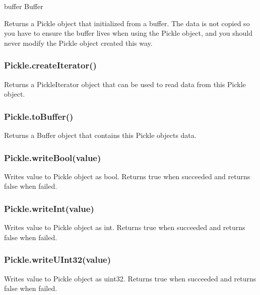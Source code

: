 \begin{DoxyItemize}
\item {\ttfamily buffer} Buffer
\end{DoxyItemize}

Returns a {\ttfamily Pickle} object that initialized from a {\ttfamily buffer}. The data is not copied so you have to ensure the {\ttfamily buffer} lives when using the Pickle object, and you should never modify the Pickle object created this way.

\subsubsection*{Pickle.\+create\+Iterator()}

Returns a {\ttfamily Pickle\+Iterator} object that can be used to read data from this {\ttfamily Pickle} object.

\subsubsection*{Pickle.\+to\+Buffer()}

Returns a {\ttfamily Buffer} object that contains this {\ttfamily Pickle} object\textquotesingle{}s data.

\subsubsection*{Pickle.\+write\+Bool(value)}

Writes {\ttfamily value} to {\ttfamily Pickle} object as {\ttfamily bool}. Returns {\ttfamily true} when succeeded and returns {\ttfamily false} when failed.

\subsubsection*{Pickle.\+write\+Int(value)}

Writes {\ttfamily value} to {\ttfamily Pickle} object as {\ttfamily int}. Returns {\ttfamily true} when succeeded and returns {\ttfamily false} when failed.

\subsubsection*{Pickle.\+write\+U\+Int32(value)}

Writes {\ttfamily value} to {\ttfamily Pickle} object as {\ttfamily uint32}. Returns {\ttfamily true} when succeeded and returns {\ttfamily false} when failed.

